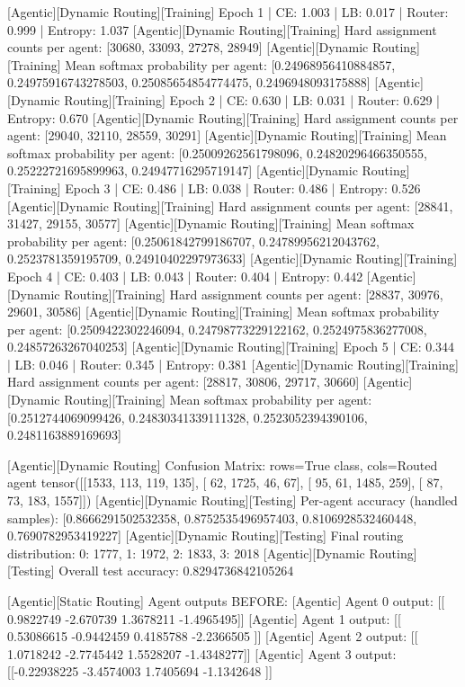 [Agentic][Dynamic Routing][Training] Epoch 1 | CE: 1.003 | LB: 0.017 | Router: 0.999 | Entropy: 1.037
[Agentic][Dynamic Routing][Training] Hard assignment counts per agent: [30680, 33093, 27278, 28949]
[Agentic][Dynamic Routing][Training] Mean softmax probability per agent: [0.24968956410884857, 0.24975916743278503, 0.25085654854774475, 0.2496948093175888]
[Agentic][Dynamic Routing][Training] Epoch 2 | CE: 0.630 | LB: 0.031 | Router: 0.629 | Entropy: 0.670
[Agentic][Dynamic Routing][Training] Hard assignment counts per agent: [29040, 32110, 28559, 30291]
[Agentic][Dynamic Routing][Training] Mean softmax probability per agent: [0.25009262561798096, 0.24820296466350555, 0.25222721695899963, 0.24947716295719147]
[Agentic][Dynamic Routing][Training] Epoch 3 | CE: 0.486 | LB: 0.038 | Router: 0.486 | Entropy: 0.526
[Agentic][Dynamic Routing][Training] Hard assignment counts per agent: [28841, 31427, 29155, 30577]
[Agentic][Dynamic Routing][Training] Mean softmax probability per agent: [0.25061842799186707, 0.24789956212043762, 0.2523781359195709, 0.24910402297973633]
[Agentic][Dynamic Routing][Training] Epoch 4 | CE: 0.403 | LB: 0.043 | Router: 0.404 | Entropy: 0.442
[Agentic][Dynamic Routing][Training] Hard assignment counts per agent: [28837, 30976, 29601, 30586]
[Agentic][Dynamic Routing][Training] Mean softmax probability per agent: [0.2509422302246094, 0.24798773229122162, 0.2524975836277008, 0.24857263267040253]
[Agentic][Dynamic Routing][Training] Epoch 5 | CE: 0.344 | LB: 0.046 | Router: 0.345 | Entropy: 0.381
[Agentic][Dynamic Routing][Training] Hard assignment counts per agent: [28817, 30806, 29717, 30660]
[Agentic][Dynamic Routing][Training] Mean softmax probability per agent: [0.2512744069099426, 0.24830341339111328, 0.2523052394390106, 0.2481163889169693]

[Agentic][Dynamic Routing] Confusion Matrix: rows=True class, cols=Routed agent
tensor([[1533,  113,  119,  135],
[  62, 1725,   46,   67],
[  95,   61, 1485,  259],
[  87,   73,  183, 1557]])
[Agentic][Dynamic Routing][Testing] Per-agent accuracy (handled samples): [0.8666291502532358, 0.8752535496957403, 0.8106928532460448, 0.7690782953419227]
[Agentic][Dynamic Routing][Testing] Final routing distribution: {0: 1777, 1: 1972, 2: 1833, 3: 2018}
[Agentic][Dynamic Routing][Testing] Overall test accuracy: 0.8294736842105264

[Agentic][Static Routing] Agent outputs BEFORE:
[Agentic] Agent 0 output: [[ 0.9822749 -2.670739   1.3678211 -1.4965495]]
[Agentic] Agent 1 output: [[ 0.53086615 -0.9442459   0.4185788  -2.2366505 ]]
[Agentic] Agent 2 output: [[ 1.0718242 -2.7745442  1.5528207 -1.4348277]]
[Agentic] Agent 3 output: [[-0.22938225 -3.4574003   1.7405694  -1.1342648 ]]


